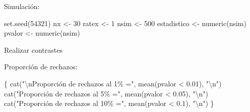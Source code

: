 \documentclass[
]{book}
\newenvironment{Shaded}{\begin{snugshade}}{\end{snugshade}}
\newcommand{\AttributeTok}[1]{\textcolor[rgb]{0.77,0.63,0.00}{#1}}
\newcommand{\CommentTok}[1]{\textcolor[rgb]{0.56,0.35,0.01}{\textit{#1}}}
\newcommand{\ControlFlowTok}[1]{\textcolor[rgb]{0.13,0.29,0.53}{\textbf{#1}}}
\newcommand{\DecValTok}[1]{\textcolor[rgb]{0.00,0.00,0.81}{#1}}
\newcommand{\FloatTok}[1]{\textcolor[rgb]{0.00,0.00,0.81}{#1}}
\newcommand{\FunctionTok}[1]{\textcolor[rgb]{0.00,0.00,0.00}{#1}}
\newcommand{\NormalTok}[1]{#1}
\newcommand{\OtherTok}[1]{\textcolor[rgb]{0.56,0.35,0.01}{#1}}
\newcommand{\SpecialCharTok}[1]{\textcolor[rgb]{0.00,0.00,0.00}{#1}}
\newcommand{\StringTok}[1]{\textcolor[rgb]{0.31,0.60,0.02}{#1}}
\theoremstyle{break}
\theoremstyle{definition}
\theoremstyle{definition}
\theoremstyle{definition}
\theoremstyle{definition}
\theoremstyle{remark}
\begin{document}
\begin{enumerate}
  Simulación:

\begin{Shaded}
\begin{Highlighting}[]
\FunctionTok{set.seed}\NormalTok{(}\DecValTok{54321}\NormalTok{)}
\NormalTok{nx }\OtherTok{\textless{}{-}} \DecValTok{30}
\NormalTok{ratex }\OtherTok{\textless{}{-}} \DecValTok{1}
\NormalTok{nsim }\OtherTok{\textless{}{-}} \DecValTok{500}
\NormalTok{estadistico }\OtherTok{\textless{}{-}} \FunctionTok{numeric}\NormalTok{(nsim)}
\NormalTok{pvalor }\OtherTok{\textless{}{-}} \FunctionTok{numeric}\NormalTok{(nsim)}
\end{Highlighting}
\end{Shaded}

  Realizar contrastes

\begin{Shaded}
\end{Shaded}

  Proporción de rechazos:

\begin{Shaded}
\begin{Highlighting}[]
\NormalTok{\{}
  \FunctionTok{cat}\NormalTok{(}\StringTok{"}\SpecialCharTok{\textbackslash{}n}\StringTok{Proporción de rechazos al 1\% ="}\NormalTok{, }\FunctionTok{mean}\NormalTok{(pvalor }\SpecialCharTok{\textless{}} \FloatTok{0.01}\NormalTok{), }\StringTok{"}\SpecialCharTok{\textbackslash{}n}\StringTok{"}\NormalTok{)}
  \FunctionTok{cat}\NormalTok{(}\StringTok{"Proporción de rechazos al 5\% ="}\NormalTok{, }\FunctionTok{mean}\NormalTok{(pvalor }\SpecialCharTok{\textless{}} \FloatTok{0.05}\NormalTok{), }\StringTok{"}\SpecialCharTok{\textbackslash{}n}\StringTok{"}\NormalTok{)}
  \FunctionTok{cat}\NormalTok{(}\StringTok{"Proporción de rechazos al 10\% ="}\NormalTok{, }\FunctionTok{mean}\NormalTok{(pvalor }\SpecialCharTok{\textless{}} \FloatTok{0.1}\NormalTok{), }\StringTok{"}\SpecialCharTok{\textbackslash{}n}\StringTok{"}\NormalTok{)}
\NormalTok{\}}
\end{Highlighting}
\end{Shaded}


\end{enumerate}
\end{document}
